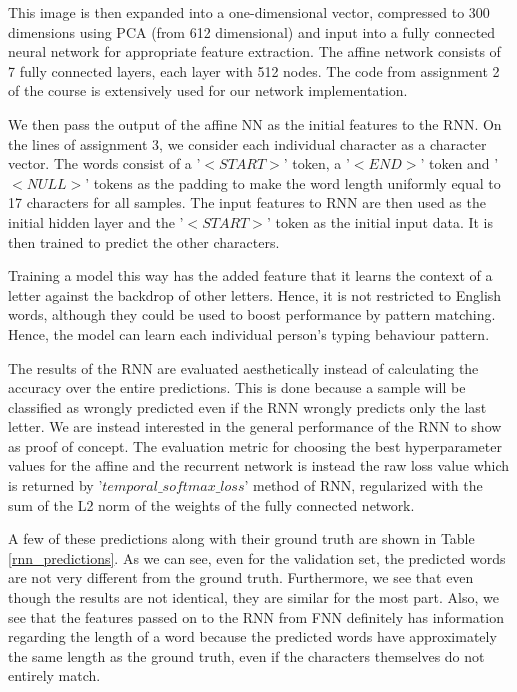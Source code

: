 \documentclass[10pt,twocolumn,letterpaper]{article}
\begin{document}
This image is then expanded into a one-dimensional vector, compressed to 300 dimensions using PCA (from 612 dimensional) and input into a fully connected neural network for appropriate feature extraction. The affine network consists of 7 fully connected layers, each layer with 512 nodes. The code from assignment 2 of the course is extensively used for our network implementation.

We then pass the output of the affine NN as the initial features to the RNN. On the lines of assignment 3, we consider each individual character as a character vector. The words consist of a '$<START>$' token, a '$<END>$' token and '$<NULL>$' tokens as the padding to make the word length uniformly equal to 17 characters for all samples. The input features to RNN are then used as the initial hidden layer and the '$<START>$' token as the initial input data. It is then trained to predict the other characters.

Training a model this way has the added feature that it learns the context of a letter against the backdrop of other letters. Hence, it is not restricted to English words, although they could be used to boost performance by pattern matching. Hence, the model can learn each individual person's typing behaviour pattern.

The results of the RNN are evaluated aesthetically instead of calculating the accuracy over the entire predictions. This is done because a sample will be classified as wrongly predicted even if the RNN wrongly predicts only the last letter. We are instead interested in the general performance of the RNN to show as proof of concept. The evaluation metric for choosing the best hyperparameter values for the affine and the recurrent network is instead the raw loss value which is returned by '$temporal\_softmax\_loss$' method of RNN, regularized with the sum of the L2 norm of the weights of the fully connected network.

A few of these predictions along with their ground truth are shown in Table \ref{rnn_predictions}. As we can see, even for the validation set, the predicted words are not very different from the ground truth. Furthermore, we see that even though the results are not identical, they are similar for the most part. Also, we see that the features passed on to the RNN from FNN definitely has information regarding the length of a word because the predicted words have approximately the same length as the ground truth, even if the characters themselves do not entirely match.
\end{document}
